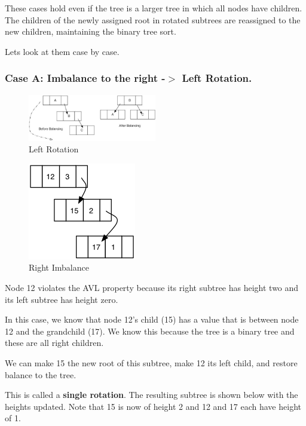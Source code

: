 These cases hold even if the tree is a larger tree in which all nodes have children. The children of the newly assigned root in rotated subtrees are reassigned to the new children, maintaining the binary tree sort.

Lets look at them case by case.\newline

\subsubsection{Case A: Imbalance to the right -$>$ Left Rotation.}

\begin{figure}[H]
\centering
\includegraphics[width=0.5\textwidth]{pictures/leftrotate.jpg}
\caption{Left Rotation}
\label{fig:leftrotate}
\end{figure}

\begin{figure}[H]
\centering
\includegraphics{pictures/tree16.png}
\caption{Right Imbalance}
\label{fig:tree16}
\end{figure}

Node 12 violates the AVL property because its right subtree has height two and its left subtree has height zero.

In this case, we know that node 12's child (15) has a value that is between node 12 and the grandchild (17). We know this because the tree is a binary tree and these are all right children.

We can make 15 the new root of this subtree, make 12 its left child, and restore balance to the tree.

This is called a \textbf{single rotation}. The resulting subtree is shown below with the heights updated. Note that 15 is now of height 2 and 12 and 17 each have height of 1.

